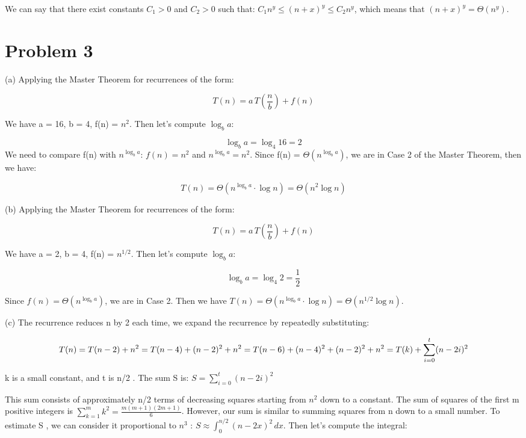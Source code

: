\documentclass[12 pt]{article}
\begin{document}
We can say that there exist constants $C_1 > 0$ and $C_2 > 0$ such that: $C_1 n^y \leq (n + x)^y \leq C_2 n^y$, which means that
$(n + x)^y = \Theta(n^y)$.

\vspace{1cm}

\section*{Problem 3}
(a) Applying the Master Theorem for recurrences of the form:

\[
T(n) = a\, T\left( \dfrac{n}{b} \right) + f(n)
\]

We have a = 16, b = 4, f(n) = $n^2$. Then let's compute $\log_b a$:

\[
\log_b a = \log_4 16 = 2
\]
We need to compare f(n) with $n^{\log_b a}$: $f(n) = n^2$ and $n^{\log_b a} = n^{2}$. Since f(n) = $\Theta\left( n^{\log_b a} \right)$, we are in Case 2 of the Master Theorem, then we have:

\[
T(n) = \Theta\left( n^{\log_b a} \cdot \log n \right) = \Theta\left( n^2 \log n \right)
\]

(b) Applying the Master Theorem for recurrences of the form:

\[
T(n) = a\, T\left( \dfrac{n}{b} \right) + f(n)
\]

We have a = 2, b = 4, f(n) = $n^{1/2}$. Then let's compute $\log_b a$:

\[
\log_b a = \log_4 2 = \dfrac{1}{2}
\]

Since $f(n) = \Theta\left( n^{\log_b a} \right)$, we are in Case 2. Then we have $T(n) = \Theta\left( n^{\log_b a} \cdot \log n \right) = \Theta\left( n^{1/2} \log n \right)$.


(c) The recurrence reduces  n  by 2 each time, we expand the recurrence by repeatedly substituting:

\[
T(n) = T(n - 2) + n^2 \\
= T(n - 4) + (n - 2)^2 + n^2 \\
= T(n - 6) + (n - 4)^2 + (n - 2)^2 + n^2 \\
= T(k) + \sum_{i=0}^{t} (n - 2i)^2
\]

k  is a small constant, and  t  is  n/2 . The sum  S  is: $S = \sum_{i=0}^{t} (n - 2i)^2$

This sum consists of approximately  n/2  terms of decreasing squares starting from  $n^2$  down to a constant. The sum of squares of the first  m  positive integers is  $\sum_{k=1}^{m} k^2 = \frac{m(m + 1)(2m + 1)}{6}$. However, our sum is similar to summing squares from  n  down to a small number. To estimate  S , we can consider it proportional to  $n^3$ : $S \approx \int_{0}^{n/2} (n - 2x)^2 \, dx$. Then let's compute the integral:
\end{document}
